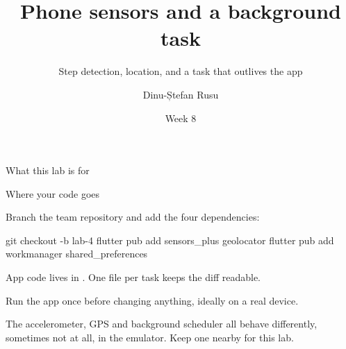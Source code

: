 \documentclass[10pt,aspectratio=169,t]{beamer}
\title{Phone sensors and a background task}
\subtitle{Step detection, location, and a task that outlives the app}
\author{Dinu-Ștefan Rusu}
\institute{FILS, Universitatea Politehnica București}
\date{Week 8}
\begin{document}
\titleframe

\begin{frame}[eyebrow=Today]{What this lab is for}
  \vskip 2mm
  \begin{grid}[2]
  \end{grid}
  \vskip 6mm
\end{frame}

\begin{frame}[fragile,eyebrow=Setup]{Where your code goes}
  \begin{steps}
    \item Branch the team repository and add the four dependencies:
\begin{shell}
git checkout -b lab-4
flutter pub add sensors_plus geolocator
flutter pub add workmanager shared_preferences
\end{shell}
    \item App code lives in . One file per task keeps the diff readable.
    \item Run the app once before changing anything, ideally on a real device.
  \end{steps}
  \begin{hint}
    The accelerometer, GPS and background scheduler all behave differently, sometimes not at all, in the emulator. Keep one nearby for this lab.
  \end{hint}
\end{frame}
\end{document}
